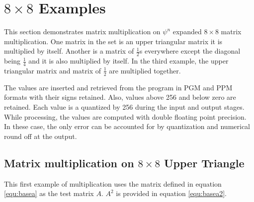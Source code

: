 


\section{$8\times 8$ Examples}
This section demonstrates matrix multiplication on $\psi^n$ expanded $8\times8$ matrix multiplication.  %
One matrix in the set is an upper triangular matrix it is multiplied by itself.  %
Another is a matrix of $\frac{1}{2}$s everywhere except the diagonal being $\frac{1}{4}$ and it is also multiplied by itself.  In the third example, the  upper triangular matrix and matrix of $\frac{1}{2}$ are multiplied together.  

The values are inserted and retrieved from the program in PGM and PPM formats with their signs retained.  Also, values above 256 and below zero are retained.  Each value is a quantized by 256 during the input and output stages.  While processing, the values are computed with double floating point precision.  In these case, the only error can be accounted for by quantization and numerical round off at the output.

\subsection{Matrix multiplication on $8\times 8$ Upper Triangle} \label{sec:uppertriangle}
This first example of multiplication uses the matrix defined in equation \ref{equ:basea} as the test matrix $A$.   $A^2$ is provided in equation \ref{equ:basea2}.  %

